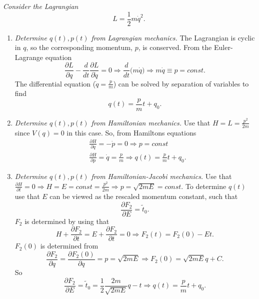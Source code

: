 \begin{example}
	\emph{Consider the Lagrangian}
	\begin{equation}
		L=\frac{1}{2}m\dot{q}^2.
	\end{equation} 
	\begin{enumerate}
		\item \emph{Determine $q(t),p(t)$ from Lagrangian mechanics.}
		The Lagrangian is cyclic in $q$, so the corresponding momentum, $p$, is conserved. From the Euler-Lagrange equation
		\begin{equation}
			\frac{\partial L}{\partial q}-\frac{d}{d t}\frac{\partial L}{\partial \dot{q}}=0\Rightarrow \frac{d }{d t}\bigg(m\dot q\bigg)\Rightarrow m\dot{q}\equiv p=const.
		\end{equation} 
		The differential equation ($\dot{q}=\frac{p}{m}$) can be solved by separation of variables to find
		\begin{equation}
			q(t)=\frac{p}{m}t+q_0.
		\end{equation} 
		
		\item \emph{Determine $q(t),p(t)$ from Hamiltonian mechanics.}
		Use that $H=L=\frac{p^2}{2m}$ since $V(q)=0$ in this case. So, from Hamiltons equations
		\begin{equation}
			\begin{split}
				&\frac{\partial H}{\partial q}=-\dot{p}=0\Rightarrow p=const\\
				&\frac{\partial H}{\partial p}=\dot{q}=\frac{p}{m}\Rightarrow q(t)=\frac{p}{m}t+q_0.
			\end{split}
		\end{equation} 
		
		\item \emph{Determine $q(t),p(t)$ from Hamiltonian-Jacobi mechanics.}
		Use that $\frac{\partial H}{\partial t}=0\Rightarrow H=E=const=\frac{p^2}{2m}\Rightarrow p=\sqrt{2mE}=const$. To determine $q(t)$ use that $E$ can be viewed as the rescaled momentum constant, such that
		\begin{equation}
			\frac{\partial F_2}{\partial E}=\tilde{t}_0.
		\end{equation} 
		$F_2$ is determined by using that
		\begin{equation}
			H+\frac{\partial F_2}{\partial t}=E+\frac{\partial F_2}{\partial t}=0\Rightarrow F_2(t)=F_2(0)-Et.
		\end{equation} 
		$F_2(0)$ is determined from
		\begin{equation}
			\frac{\partial F_2}{\partial q}=\frac{\partial F_2(0)}{\partial q}=p=\sqrt{2mE}\Rightarrow F_2(0)=\sqrt{2mE}q+C .
		\end{equation} 
		So
		\begin{equation}
			\frac{\partial F_2}{\partial E}=\tilde{t}_0=\frac{1}{2}\frac{2m}{\sqrt{2mE}}q-t\Rightarrow q(t)=\frac{p}{m}t+q_0.
		\end{equation} 
	\end{enumerate}
	
\end{example}

